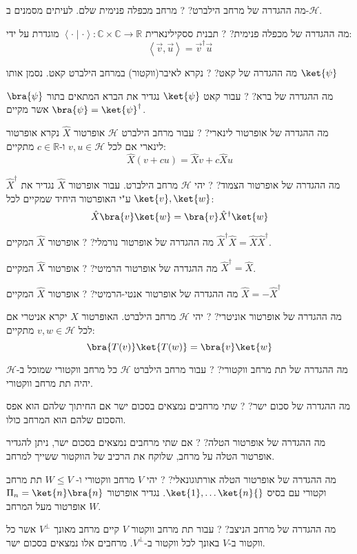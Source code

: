 \documentclass{tstextbook}
\begin{document}
מה ההגדרה של מרחב הילברט?
?
מרחב מכפלה פנימית שלם. לעיתים מסמנים ב-\(\mathcal{H}\).

מה ההגדרה של מכפלה פנימית?
?
תבנית ססקילינארית \(\left\langle  \cdot \mid\cdot  \right\rangle:\mathbb{C}\times \mathbb{C}\to \mathbb{R}\) מוגדרת על ידי:
$$\left\langle  \vec{v},\vec{u}  \right\rangle ={\vec{v}}^{\dagger} \vec{u}$$

מה ההגדרה של קאט?
?
נקרא לאיבר(ווקטור) במרחב הילברט קאט. נסמן אותו \(\ket{\psi}\)

מה ההגדרה של ברא?
?
עבור קאט \(\ket{\psi}\) נגדיר את הברא המתאים בתור \(\bra{\psi}\) אשר מקיים \(\bra{\psi}=\ket{\psi}^{\dagger}\).

מה ההגדרה של אופרטור לינארי?
?
עבור מרחב הילברט \(\mathcal{H}\) אופרטור \(\hat{X}\) נקרא אופרטור לינארי אם לכל \(v,u \in \mathcal{H}\) ו-\(c \in \mathbb{R}\) מתקיים:
$$\hat{X}(v+cu)=\hat{X}v+c\hat{X}u$$

מה ההגדרה של אופרטור הצמוד?
?
יהי \(\mathcal{H}\) מרחב הילברט. עבור אופרטור \(\hat{X}\) נגדיר את \(\hat{X}^{\dagger}\) ע"י האופרטור היחיד שמקיים לכל \(\ket{v},\ket{w}\):
$$\hat{X}\bra{v} \ket{w} =\bra{v} \hat{X}^{\dagger}\ket{w} $$

מה ההגדרה של אופרטור נורמלי?
?
אופרטור \(\hat{X}\) המקיים \(\hat{X}^{\dagger}\hat{X}=\hat{X}\hat{X}^{\dagger}\).

מה ההגדרה של אופרטור הרמיטי?
?
אופרטור \(\hat{X}\) המקיים \(\hat{X}^{\dagger}=\hat{X}\).

מה ההגדרה של אופרטור אנטי-הרמיטי?
?
אופרטור \(\hat{X}\) המקיים \(\hat{X}=-\hat{X}^{\dagger}\)

מה ההגדרה של אופרטור אוניטרי?
?
יהי \(\mathcal{H}\) מרחב הילברט. האופרטור \(\hat{X}\) יקרא אניטרי אם לכל \(v,w \in \mathcal{H}\) מתקיים:
$$\bra{T(v)}\ket{T(w)} =\bra{v} \ket{w}  $$

מה ההגדרה של תת מרחב ווקטורי?
?
עבור מרחב הילברט \(\mathcal{H}\) כל מרחב ווקטורי שמוכל ב-\(\mathcal{H}\) יהיה תת מרחב ווקטורי.

מה ההגדרה של סכום ישר?
?
שתי מרחבים נמצאים בסכום ישר אם החיתוך שלהם הוא אפס והסכום שלהם הוא המרחב כולו.

מה ההגדרה של אופרטור הטלה?
?
אם שתי מרחבים נמצאים בסכום ישר, ניתן להגדיר אופרטור הטלה על מרחב, שלוקח את הרכיב של הווקטור ששייך למרחב.

מה ההגדרה של אופרטור הטלה אורתוגונאלי?
?
יהי \(V\) מרחב ווקטורי ו- \(W\leq V\) תת מרחב וקטורי עם בסיס \(\ket{1},\dots \ket{n}{}\). 
נגדיר אופרטור \(\Pi_{n}= \ket{n}\bra{n}\) אופרטור מעל המרחב \(W\).

מה ההגדרה של מרחב הניצב?
?
עבור תת מרחב ווקטור \(V\) קיים מרחב מאונך \(V^\perp\) אשר כל ווקטור ב-\(V\) באונך לכל ווקטור ב-\(V^\perp\). מרחבים אלו נמצאים בסכום ישר.
\end{document}
